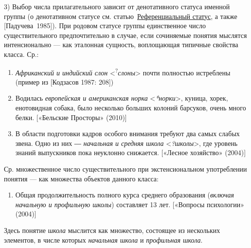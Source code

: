 3) Выбор числа прилагательного зависит от денотативного статуса именной
группы (о денотативном статусе см. статью~\underline{Референциальный
статус}, а также {[}Падучева~1985{]}). При родовом статусе группы
единственное число существительного предпочтительно в случае, если
сочиняемые понятия мыслятся интенсионально --- как эталонная сущность,
воплощающая типичные свойства класса. Ср.:

\begin{enumerate}
\def\labelenumi{(\arabic{enumi})}
\setcounter{enumi}{145}
\item
  \textit{Африканский и индийский слон}
  \textless{}\textsuperscript{?}\textit{слоны}\textgreater{} почти
  полностью истреблены (пример из {[}Кодзасов 1987: 208{]})
\item
  Водилась \textit{европейская и американская норка}
  \textless{}\textit{*норки}\textgreater, куница, хорек, енотовидная
  собака, было несколько больших колоний барсуков, очень много белки.
  {[}«Бельские Просторы» (2010){]}
\item
  В области подготовки кадров особого внимания требуют два самых слабых
  звена. Одно из них ― \textit{начальная и средняя школа}
  \textless{}\textit{?школы}\textgreater, где уровень знаний выпускников
  пока неуклонно снижается. {[}«Лесное хозяйство» (2004){]}
\end{enumerate}

Ср. множественное число существительного при экстенсиональном
употреблении понятия --- как множества объектов данного класса:

\begin{enumerate}
\def\labelenumi{(\arabic{enumi})}
\setcounter{enumi}{148}
\item
  Общая продолжительность полного курса среднего образования
  (\textit{включая начальную и профильную школы}) составляет 13 лет.
  {[}«Вопросы психологии» (2004){]}
\end{enumerate}

Здесь понятие \textit{школа} мыслится как множество, состоящее из
нескольких элементов, в числе которых \textit{начальная школа} и
\textit{профильная школа}.

